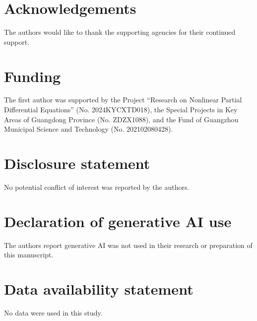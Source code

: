 \documentclass{interact}
\numberwithin{equation}{section}
\theoremstyle{plain}
\theoremstyle{definition}
\theoremstyle{remark}
\begin{document}
\section*{Acknowledgements}
The authors would like to thank the supporting agencies for their continued support.

\section*{Funding}
The first author was supported by the Project ``Research on Nonlinear Partial Differential Equations'' (No. 2024KYCXTD018), the Special Projects in Key Areas of Guangdong Province (No. ZDZX1088), and the Fund of Guangzhou Municipal Science and Technology (No. 202102080428).

\section*{Disclosure statement}
No potential conflict of interest was reported by the authors.

\section*{Declaration of generative AI use}
The authors report generative AI was not used in their research or preparation of this manuscript.

\section*{Data availability statement}
No data were used in this study.
\end{document}
